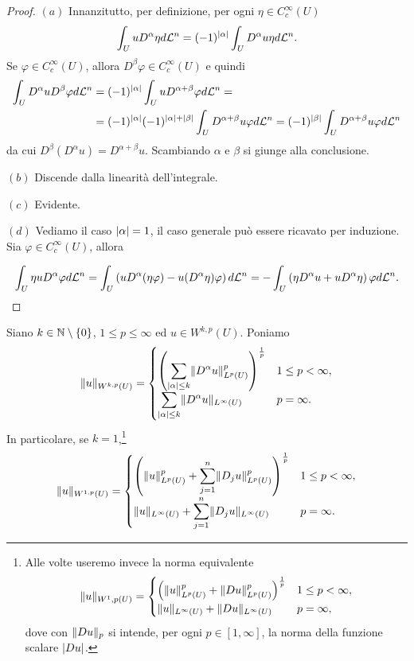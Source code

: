 \begin{proof}\hfill
	\par\noindent
	$(a)$ Innanzitutto, per definizione, per ogni $\eta \in C^\infty_c(U)$
	\[ \int_{U} u D^\alpha \eta d\mathcal{L}^n = (-1)^{\lvert\alpha\rvert} \int_{U} D^\alpha u \eta d\mathcal{L}^n. \]
	Se $\varphi \in C^\infty_c(U)$, allora $D^\beta \varphi \in C^\infty_{c}(U)$ e quindi
	\begin{align*}
		\int_{U} D^\alpha u D^\beta \varphi d\mathcal{L}^n &= (-1)^{\lvert\alpha\rvert} \int_{U}  u D^{\alpha + \beta} \varphi d\mathcal{L}^n = \\ 
		& =(-1)^{\lvert\alpha\rvert} (-1)^{\lvert\alpha\rvert + \lvert\beta\rvert} \int_{U} D^{\alpha + \beta} u \varphi  d\mathcal{L}^n = (-1)^{\lvert\beta\rvert} \int_{U} D^{\alpha + \beta} u \varphi  d\mathcal{L}^n
	\end{align*}
	da cui $D^\beta(D^\alpha u) = D^{\alpha + \beta} u$. Scambiando $\alpha$ e $\beta$ si giunge alla conclusione.
	\par\noindent
	$(b)$ Discende dalla linearità dell'integrale.
	\par\noindent
	$(c)$ Evidente.
	\par\noindent
	$(d)$ Vediamo il caso $\lvert\alpha\rvert = 1$, il caso generale può essere ricavato per induzione. Sia $\varphi \in C^\infty_c(U)$, allora
	
	\[ \int_{U} \eta u D^\alpha \varphi d\mathcal{L}^n  =\int_{U} \left( u D^\alpha(\eta \varphi) - u (D^\alpha \eta)\varphi\right) d\mathcal{L}^n =- \int_{U}\left( \eta D^\alpha u + uD^\alpha \eta\right) \varphi d\mathcal{L}^n.  \qedhere \]
	
\end{proof}

\begin{definizione}
	Siano $k \in \mathbb{N}\setminus\left\lbrace 0\right\rbrace $, $1 \le p \le \infty$ ed $u \in W^{k,p}(U)$. Poniamo 
	\[ \lVert u\rVert_{W^{k,p}(U)} = \begin{cases}
		\left( \displaystyle \sum_{\lvert\alpha\rvert \le k} \lVert D^\alpha u\rVert_{L^p(U)}^p\right) ^{\frac{1}{p}} & 1 \le p < \infty, \\
		\displaystyle \sum_{\lvert\alpha\rvert \le k} \lVert D^\alpha u\rVert_{L^\infty(U)} & p=\infty.
	\end{cases} \]
	In particolare, se $k = 1$,\footnote{Alle volte useremo invece la norma equivalente
		\[ \lVert u\rVert_{W^1,p(U)} = \begin{cases}
			\left( \lVert u\rVert_{L^p(U)}^p + \lVert D u\rVert_{L^p(U)}^p\right) ^{\frac{1}{p}} & 1 \le p < \infty, \\
			\lVert u\rVert_{L^\infty(U)} + \lVert D u\rVert_{L^\infty(U)} & p=\infty,
		\end{cases} \]
		dove con $\lVert D u\rVert_p$ si intende, per ogni $p \in [1,\infty]$, la norma della funzione scalare $\lvert Du\rvert$.} 
	\[ \lVert u\rVert_{W^{1,p}(U)} = \begin{cases}
		\left( \lVert u\rVert_{L^p(U)}^p + \displaystyle \sum_{j = 1}^{n}\lVert D_j u\rVert_{L^p(U)}^p\right) ^{\frac{1}{p}} & 1 \le p < \infty, \\
		\lVert u\rVert_{L^\infty(U)} + \displaystyle \sum_{j = 1}^{n}\lVert D_j u\rVert_{L^\infty(U)} & p=\infty. 
	\end{cases} \]
	
\end{definizione}

